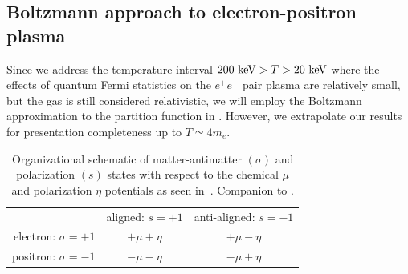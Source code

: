 \subsection{Boltzmann approach to electron-positron plasma}
\label{sec:boltzmann}
\noindent Since we address the temperature interval $200\text{ keV}>T>20\text{ keV}$ where the effects of quantum Fermi statistics on the $e^{+}e^{-}$ pair plasma are relatively small, but the gas is still considered relativistic, we will employ the Boltzmann approximation to the partition function in . However, we extrapolate our results for presentation completeness up to $T\simeq 4m_{e}$.

\begin{table}[ht]
 \centering
 \begin{tabular}{ r|c|c| }
 \multicolumn{1}{r}{}
 & \multicolumn{1}{c}{aligned: $s=+1$}
 & \multicolumn{1}{c}{anti-aligned: $s=-1$} \\
 \cline{2-3}
 electron: $\sigma=+1$ & $+\mu+\eta$ & $+\mu-\eta$ \TBstrut\\
 \cline{2-3}
 positron: $\sigma=-1$ & $-\mu-\eta$ & $-\mu+\eta$ \TBstrut\\
 \cline{2-3}
 \end{tabular}\\\,\Bstrut\\
 \caption{Organizational schematic of matter-antimatter $(\sigma)$ and polarization $(s)$ states with respect to the chemical $\mu$ and polarization $\eta$ potentials as seen in~. Companion to .}
 \label{fig:org}
\end{table}

